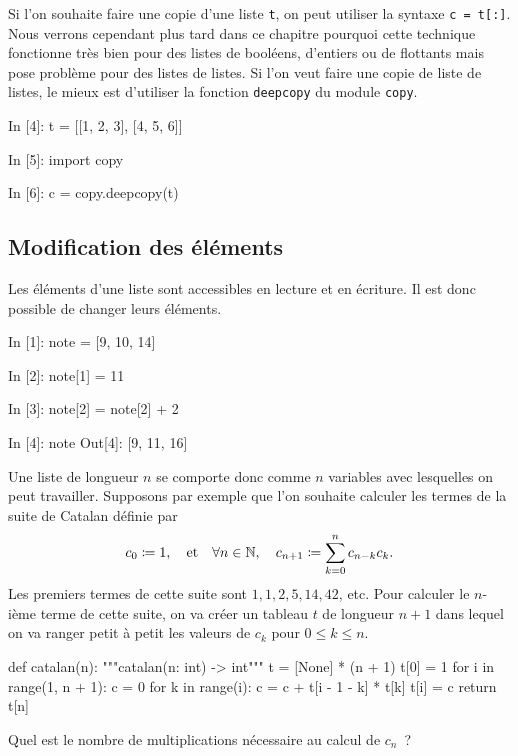 \documentclass{magnolia}
\begin{document}
Si l'on souhaite faire une copie d'une liste \verb!t!, on peut
utiliser la syntaxe \verb!c = t[:]!. Nous verrons cependant plus tard
dans ce chapitre pourquoi cette technique fonctionne très bien pour
des listes de booléens, d'entiers ou de flottants mais pose problème
pour des listes de listes. Si l'on veut faire une copie de liste
de listes, le mieux est d'utiliser la
fonction \verb!deepcopy! du module \verb!copy!.

\begin{pythoncode}
In [4]: t = [[1, 2, 3], [4, 5, 6]]

In [5]: import copy

In [6]: c = copy.deepcopy(t)
\end{pythoncode}


\subsection{Modification des éléments}

Les éléments d'une liste sont accessibles en lecture et en écriture. Il est donc possible de changer leurs éléments.

\begin{pythoncode}
In [1]: note = [9, 10, 14]

In [2]: note[1] = 11

In [3]: note[2] = note[2] + 2

In [4]: note
Out[4]: [9, 11, 16]    
\end{pythoncode}
\noindent
Une liste de longueur $n$ se comporte donc comme $n$ variables avec lesquelles on peut
travailler. Supposons par exemple que l'on souhaite calculer les termes de la suite de Catalan
définie par
\[c_0\coloneqq 1,\quad \text{et}\quad \forall n\in\mathbb{N},\quad c_{n+1}\coloneqq\sum_{k=0}^n c_{n-k}c_k.\]
Les premiers termes de cette suite sont $1, 1, 2, 5, 14, 42$, etc. Pour calculer le $n$-ième
terme de cette suite, on va créer un tableau $t$ de longueur $n+1$ dans lequel on va ranger
petit à petit les valeurs de $c_k$ pour $0\leq k\leq n$.

\begin{pythoncode}
def catalan(n):
    """catalan(n: int) -> int"""
    t = [None] * (n + 1)
    t[0] = 1
    for i in range(1, n + 1):
        c = 0
        for k in range(i):
            c = c + t[i - 1 - k] * t[k]
        t[i] = c
    return t[n]
\end{pythoncode}

\begin{exoUnique}
\exo Quel est le nombre de multiplications nécessaire au calcul de $c_n$~?
\end{exoUnique}
\end{document}
